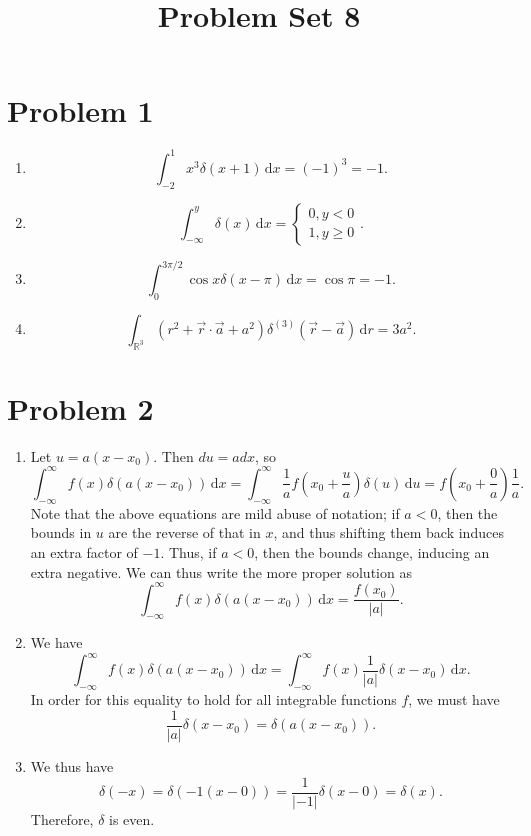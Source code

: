 \documentclass[11pt, letterpaper]{article}
\title{Problem Set 8}
\begin{document}
\makeproblem
\section*{Problem 1}
\begin{enumerate}
	\item 
		\[
			\int_{-2}^{1} x^3\delta (x+1) \,\mathrm{d} x=(-1)^3=-1
		.\]
	\item 
		\[
			\int_{-\infty }^{y} \delta (x) \,\mathrm{d} x=
			\begin{cases}
				0,y<0\\
				1,y\geq 0
			\end{cases}
		.\]
		\item
			\[
				\int_{0}^{3\pi /2} \cos x\delta (x-\pi ) \,\mathrm{d} x=\cos \pi =-1
			.\]
		\item 
			\[
				\int_{\mathbb{R} ^3} \left( r^2+\vec{r} \cdot \vec{a} +a^2 \right) \delta ^{(3)} \left( \vec{r} -\vec{a}  \right)  \,\mathrm{d} r=3a^2
			.\]
\end{enumerate}
\section*{Problem 2}
\begin{enumerate}
	\item Let $u=a(x-x_0)$. Then $du=adx$, so
		\[
			\int_{-\infty }^{\infty } f(x)\delta (a(x-x_0)) \,\mathrm{d} x=\int_{-\infty }^{\infty }\frac{1}{a} f\left( x_0+\frac{u}{a}  \right) \delta (u) \,\mathrm{d} u=f\left( x_0+\frac{0}{a}  \right) \frac{1}{a} 
		.\]
		Note that the above equations are mild abuse of notation; if $a<0$, then the bounds in $u$ are the reverse of that in $x$, and thus shifting them back induces an extra factor of $-1$. Thus, if $a<0$, then the bounds change, inducing an extra negative. We can thus write the more proper solution as
		\[
			\int_{-\infty }^{\infty } f(x)\delta (a(x-x_0)) \,\mathrm{d} x=\frac{f(x_0)}{\left| a \right| } 
		.\]
	\item We have
		\[
			\int_{-\infty }^{\infty } f(x)\delta (a(x-x_0)) \,\mathrm{d} x=\int_{-\infty }^{\infty } f(x)\frac{1}{\left| a \right| }\delta (x-x_0) \,\mathrm{d} x
		.\]
		In order for this equality to hold for all integrable functions $f$, we must have
		\[
			\frac{1}{\left| a \right| } \delta (x-x_0)=\delta (a(x-x_0))
		.\]
	\item We thus have
		\[
			\delta (-x)=\delta (-1(x-0))=\frac{1}{\left| -1 \right| } \delta (x-0)=\delta (x)
		.\]
		Therefore, $\delta $ is even.
\end{enumerate}
\end{document}
